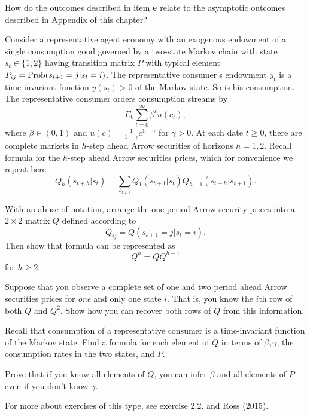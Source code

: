 \medskip
{}  How do the outcomes described in item {\bf e} relate to the asymptotic outcomes described in Appendix   of this  chapter?

\medskip

 
\medskip
\noindent  Consider a representative agent economy with an exogenous endowment of a single consumption good governed by a two-state Markov chain
with state $s_t \in \{ 1, 2\}$ having transition  matrix $P$ with typical element $P_{ij} = {\rm Prob} (s_{t+1} = j | s_t = i)$.
The representative consumer's endowment $y_t$ is a time invariant function  $y(s_t)> 0$ of the Markov state. So is his consumption.
The representative consumer orders consumption streams by
$$ E_0 \sum_{t=0}^\infty \beta^t u(c_t), $$
where $\beta \in (0,1)$ and $u(c)= {\frac{1}{1-\gamma}}c^{1-\gamma}$ for $\gamma > 0$.
At each date $t \geq 0$, there are complete markets in $h$-step ahead Arrow securities of horizons $h=1,2$.
Recall formula  for the $h$-step ahead Arrow securities prices, which  for convenience we repeat here
$$ Q_h( s_{t+h} | s_t) = \sum_{s_{t+1}} Q_1(s_{t+1} | s_t)
                      Q_{h-1}( s_{t+h} | s_{t+1}). $$

\medskip
{} With an abuse of notation, arrange the one-period Arrow security prices into a $2 \times 2$ matrix $Q$ defined
according to
$$ Q_{ij} = Q(s_{t+1} = j| s_t = i). $$
Then show that formula  can be represented as
$$ Q^h = Q Q^{h-1} $$
for $h \geq 2$.

\medskip
{}  Suppose that you observe a complete set of one and two period ahead Arrow securities prices for {\it one\/} and only one state $i$.  That is,
you know the $i$th row of both $Q$ and $Q^2$.  Show how you can recover both rows of $Q$ from this information.

\medskip
{}  Recall  that consumption of a representative consumer is a time-invariant function of the Markov state.
Find a formula for each element of $Q$  in terms of $\beta, \gamma$, the consumption rates in the two states, and  $P$.

\medskip
{} Prove that if you  know all elements of $Q$, you can infer $\beta$ and all elements of $P$ even if you don't know  $\gamma$.

\medskip
{} For more about exercises of this type, see exercise 2.2. and  Ross (2015).

